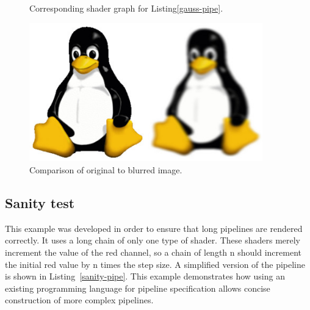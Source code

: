 \documentclass[12pt,twoside,notitlepage]{report}
\begin{document}
\begin{figure}

\caption{Corresponding shader graph for Listing\ref{gauss-pipe}.\label{gauss-graph}}
\end{figure}

\begin{figure}
\centering
\includegraphics[height=60mm]{tux-blurred.JPG}
\caption{Comparison of original to blurred image.\label{gauss-img}}
\end{figure}

\subsection*{Sanity test}
This example was developed in order to ensure that long pipelines are rendered correctly. It uses a long chain of only one type of shader. These shaders merely increment the value of the red channel, so a chain of length n should increment the initial red value by n times the step size. A simplified version of the pipeline is shown in Listing~\ref{sanity-pipe}. This example demonstrates how using an existing programming language for pipeline specification allows concise construction of more complex pipelines.
\end{document}
